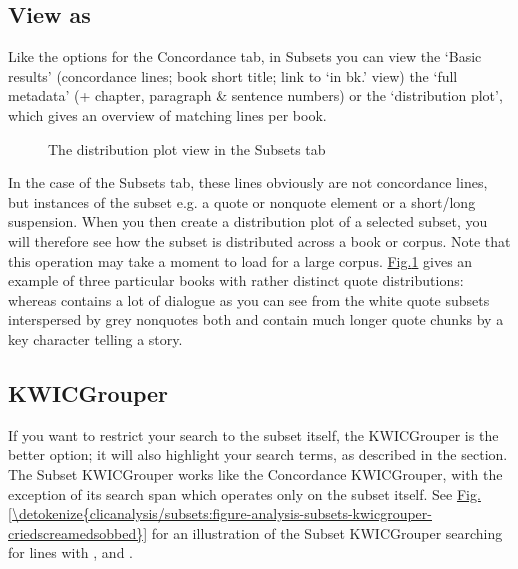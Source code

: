 \documentclass[letterpaper,10pt,english]{sphinxmanual}
\begin{document}
\subsection{View as}
\label{\detokenize{clicanalysis/subsets:view-as}}
\sphinxAtStartPar
Like the {\hyperref[\detokenize{clicanalysis/subsets:view-as}]{}} options for the Concordance tab, in Subsets you
can view the ‘Basic results’ (concordance lines; book short title; link
to ‘in bk.’ view) the ‘full metadata’ (+ chapter, paragraph \& sentence
numbers) or the ‘distribution plot’, which gives an overview of matching
lines per book.

\begin{figure}[htbp]
\centering
\capstart

\noindent{}
\caption{The distribution plot view in the Subsets tab}\label{\detokenize{clicanalysis/subsets:id6}}\label{\detokenize{clicanalysis/subsets:figure-distribution-plot-quotes}}\end{figure}

\sphinxAtStartPar
In the case of the Subsets tab, these lines obviously are not concordance
lines, but instances of the subset e.g. a quote or non\sphinxhyphen{}quote element or
a short/long suspension. When you then create a distribution plot of a
selected subset, you will therefore see how the subset is distributed
across a book or corpus. Note that this operation may take a moment to
load for a large corpus. \hyperref[\detokenize{clicanalysis/subsets:figure-distribution-plot-quotes}]{Fig.\@ \ref{\detokenize{clicanalysis/subsets:figure-distribution-plot-quotes}}} gives
an example of three particular books with rather distinct quote
distributions: whereas  contains a lot of dialogue
\textendash{} as you can see from the white quote subsets interspersed by grey
non\sphinxhyphen{}quotes \textendash{} both  and  contain
much longer quote chunks by a key character telling a story.


\subsection{KWICGrouper}
\label{\detokenize{clicanalysis/subsets:kwicgrouper}}
\sphinxAtStartPar
If you want to restrict your search to the subset itself, the
KWICGrouper is the better option; it will also highlight your search
terms, as described in the {\hyperref[\detokenize{clicanalysis/concordance:concordance}]{}} section. The Subset
KWICGrouper works like the Concordance KWICGrouper, with the exception
of its search span which operates only on the subset itself. See
\hyperref[\detokenize{clicanalysis/subsets:figure-analysis-subsets-kwicgrouper-criedscreamedsobbed}]{Fig.\@ \ref{\detokenize{clicanalysis/subsets:figure-analysis-subsets-kwicgrouper-criedscreamedsobbed}}}
for an illustration of the Subset KWICGrouper searching for lines with
,  and .
\end{document}
